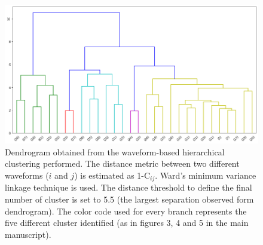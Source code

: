 \documentclass[a4paper,12pt]{article}
\begin{document}
\begin{figure}
\renewcommand{\thefigure}{S\arabic{figure}}
\begin{center}
 \noindent\includegraphics[width=1\linewidth]{dendrogram_balsorano.png} 
\end{center}
\caption{Dendrogram obtained from the waveform-based hierarchical clustering performed. The distance metric between two different waveforms ($i$ and $j$) is estimated as 1-C$_{ij}$. Ward's minimum variance linkage technique is used. The distance threshold to define the final number of cluster is set to 5.5 (the largest separation observed form dendrogram). The color code used for every branch represents the five different cluster identified (as in figures 3, 4 and 5 in the main manuscript).}
\label{fig:dendrogram}
\end{figure}
\end{document}
